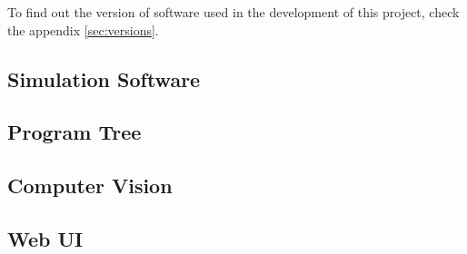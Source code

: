 To find out the version of software used in the development of this project, check the appendix \ref{sec:versions}.


\subsection{Simulation Software}
\label{subsec:simulation-software}


\subsection{Program Tree}
\label{subsec:program-tree}



\subsection{Computer Vision}
\label{subsec:computer-vision}



\subsection{Web UI}
\label{subsec:web-ui}
